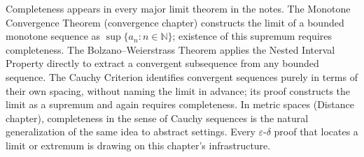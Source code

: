 

\begin{remark*}
Completeness appears in every major limit theorem in the notes.
The Monotone Convergence Theorem (convergence chapter) constructs the
limit of a bounded monotone sequence as $\sup\{a_n : n \in \mathbb{N}\}$;
existence of this supremum requires completeness.
The Bolzano--Weierstrass Theorem applies the Nested Interval Property
directly to extract a convergent subsequence from any bounded sequence.
The Cauchy Criterion identifies convergent sequences purely in terms of
their own spacing, without naming the limit in advance; its proof
constructs the limit as a supremum and again requires completeness.
In metric spaces (Distance chapter), completeness in the sense of
Cauchy sequences is the natural generalization of the same idea to
abstract settings.
Every $\varepsilon$-$\delta$ proof that locates a limit or extremum is
drawing on this chapter's infrastructure.
\end{remark*}